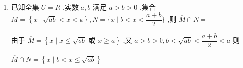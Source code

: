 \begin{enumerate}
\begin{jieda}
        $\dfrac{1}{a} + \dfrac{1}{b} = \dfrac{a + b}{ab} = \dfrac{4}{ab} \geq  1$ ,故不成立;
        
        ${a}^{2} + {b}^{2} = {\left( a + b\right) }^{2} - {2ab} = {16} - {2ab} \geq  8$ ,故成立.
    \end{jieda}
    
    \item 已知全集 $U = R$ ,实数 $a,b$ 满足 $a > b > 0$ ,集合 $M = \left\{  {x \mid  \sqrt{ab} < x < a}\right\}  ,N = \{ x \mid  b < x < \dfrac{a + b}{2}\}$ ,则 $\overline{M} \cap  N =$ 
    \begin{jieda}
        由于 $\overline{M} = \left\{  {x \mid  x \leq  \sqrt{ab}\text{ 或 }x \geq  a}\right\}$ ,又 $a > b > 0,b < \sqrt{ab} < \dfrac{a + b}{2} < a$ 则
        
        $\overline{M} \cap  N = \left\{  {x \mid  b < x \leq  \sqrt{ab}}\right\}$        
    \end{jieda}
\end{enumerate}
